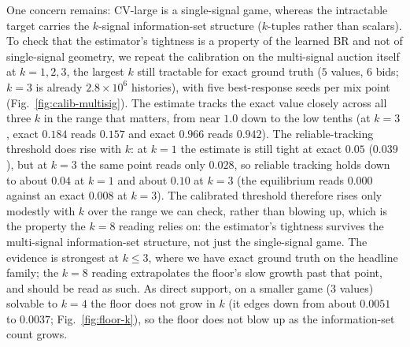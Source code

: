 \documentclass[11pt,a4paper]{article}
\begin{document}
One concern remains: CV-large is a single-signal game, whereas the intractable
target carries the $k$-signal information-set structure ($k$-tuples rather than
scalars). To check that the estimator's tightness is a property of the learned BR and
not of single-signal geometry, we repeat the calibration on the multi-signal auction
itself at $k=1,2,3$, the largest $k$ still tractable for exact ground truth ($5$
values, $6$ bids; $k=3$ is already $2.8\times10^{6}$ histories), with five
best-response seeds per mix point (Fig.~\ref{fig:calib-multisig}). The estimate tracks
the exact value closely across all three $k$ in the range that matters, from near $1.0$
down to the low tenths (at $k=3$, exact $0.184$ reads $0.157$ and exact $0.966$ reads
$0.942$). The reliable-tracking threshold does rise with $k$: at $k=1$ the estimate is
still tight at exact $0.05$ ($0.039$), but at $k=3$ the same point reads only $0.028$, so
reliable tracking holds down to about $0.04$ at $k=1$ and about $0.10$ at $k=3$ (the
equilibrium reads $0.000$ against an exact $0.008$ at $k=3$). The calibrated threshold
therefore rises only modestly with $k$ over the range we can check, rather than blowing up, which is the
property the $k=8$ reading relies on: the estimator's tightness survives the
multi-signal information-set structure, not just the single-signal game. The evidence is
strongest at $k\le3$, where we have exact ground truth on the headline family; the $k=8$
reading extrapolates the floor's slow growth past that point, and should be read as such.
As direct support, on a smaller game ($3$ values) solvable to $k=4$ the floor does not
grow in $k$ (it edges down from about $0.0051$ to $0.0037$; Fig.~\ref{fig:floor-k}), so
the floor does not blow up as the information-set count grows.
\end{document}
